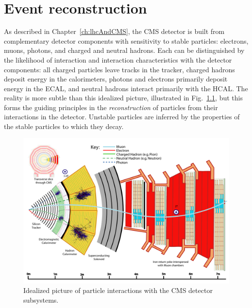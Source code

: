 \chapter{Event reconstruction}
\label{ch:reconstruction}

As described in Chapter~\ref{ch:lhcAndCMS}, the CMS detector
is built from complementary detector components with sensitivity
to stable particles: electrons, muons, photons, and charged
and neutral hadrons. Each can be distinguished by the likelihood of interaction
and interaction characteristics with the detector components:
all charged particles leave tracks in the tracker,
charged hadrons deposit energy in the calorimeters, photons
and electrons primarily deposit energy in the ECAL, and neutral
hadrons interact primarily with the HCAL.
The reality is more subtle than this idealized picture, illustrated
in Fig.~\ref{fig:particleFlow}, but this forms the guiding principles
in the \emph{reconstruction} of particles from their interactions in the detector.
Unstable particles are inferred by the properties of the stable particles to 
which they decay.

\begin{figure}[htbp]
  \centering
   \includegraphics[width=\textwidth]{figures/Reconstruction/CMSDetectorParticleFlow.pdf}
  \caption{
    Idealized picture of particle interactions with the CMS detector subsystems.
        }
 \label{fig:particleFlow}
\end{figure}

